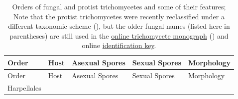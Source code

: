 \documentclass[]{book}
\begin{document}
\begin{longtable}[]{@{}lllll@{}}
\caption{\label{tab:ch4tab1} Orders of fungal and protist trichomycetes and some of their features; Note that the protist trichomycetes were recently reclassified under a different taxonomic scheme (\citet{Reynolds_2017}), but the older fungal names (listed here in parentheses) are still used in the \href{http://www.nhm.ku.edu/~fungi/Monograph/Text/Mono.htm}{online trichomycete monograph} (\citet{Lichtwardt_2001}) and online \href{http://keyserver.lucidcentral.org/key-server/data/0b08020c-0f0c-4908-8807-030c020a0002/media/Html/home.htm\%5D(http://keyserver.lucidcentral.org/key-server/data/0b08020c-0f0c-4908-8807-030c020a0002/media/Html/home.htm)}{identification key}.}\tabularnewline
\toprule
\begin{minipage}[b]{0.17\columnwidth}\raggedright
Order\strut
\end{minipage} & \begin{minipage}[b]{0.17\columnwidth}\raggedright
Host\strut
\end{minipage} & \begin{minipage}[b]{0.17\columnwidth}\raggedright
Asexual Spores\strut
\end{minipage} & \begin{minipage}[b]{0.17\columnwidth}\raggedright
Sexual Spores\strut
\end{minipage} & \begin{minipage}[b]{0.17\columnwidth}\raggedright
Morphology\strut
\end{minipage}\tabularnewline
\midrule
\endfirsthead
\toprule
\begin{minipage}[b]{0.17\columnwidth}\raggedright
Order\strut
\end{minipage} & \begin{minipage}[b]{0.17\columnwidth}\raggedright
Host\strut
\end{minipage} & \begin{minipage}[b]{0.17\columnwidth}\raggedright
Asexual Spores\strut
\end{minipage} & \begin{minipage}[b]{0.17\columnwidth}\raggedright
Sexual Spores\strut
\end{minipage} & \begin{minipage}[b]{0.17\columnwidth}\raggedright
Morphology\strut
\end{minipage}\tabularnewline
\midrule
\endhead
\begin{minipage}[t]{0.17\columnwidth}\raggedright
Harpellales\strut
\end{minipage} & \begin{minipage}[t]{0.17\columnwidth}\raggedright

\end{minipage}
\end{longtable}
\end{document}
